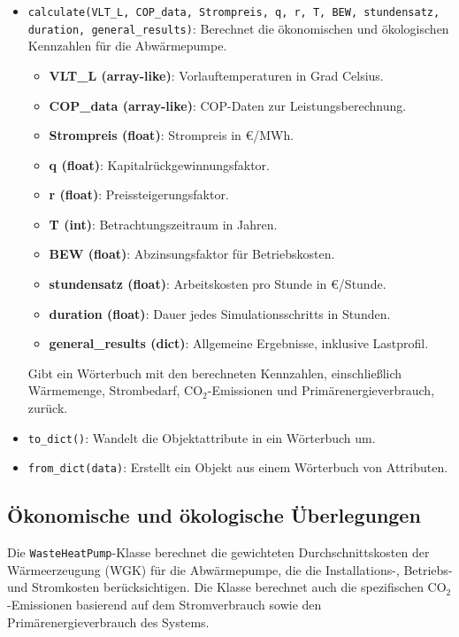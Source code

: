 \begin{itemize}
    \item \texttt{calculate(VLT\_L, COP\_data, Strompreis, q, r, T, BEW, stundensatz, duration, general\_results)}: 
    Berechnet die ökonomischen und ökologischen Kennzahlen für die Abwärmepumpe.
    \begin{itemize}
        \item \textbf{VLT\_L (array-like)}: Vorlauftemperaturen in Grad Celsius.
        \item \textbf{COP\_data (array-like)}: COP-Daten zur Leistungsberechnung.
        \item \textbf{Strompreis (float)}: Strompreis in €/MWh.
        \item \textbf{q (float)}: Kapitalrückgewinnungsfaktor.
        \item \textbf{r (float)}: Preissteigerungsfaktor.
        \item \textbf{T (int)}: Betrachtungszeitraum in Jahren.
        \item \textbf{BEW (float)}: Abzinsungsfaktor für Betriebskosten.
        \item \textbf{stundensatz (float)}: Arbeitskosten pro Stunde in €/Stunde.
        \item \textbf{duration (float)}: Dauer jedes Simulationsschritts in Stunden.
        \item \textbf{general\_results (dict)}: Allgemeine Ergebnisse, inklusive Lastprofil.
    \end{itemize}
    Gibt ein Wörterbuch mit den berechneten Kennzahlen, einschließlich Wärmemenge, Strombedarf, CO$_2$-Emissionen und Primärenergieverbrauch, zurück.

    \item \texttt{to\_dict()}: Wandelt die Objektattribute in ein Wörterbuch um.
    
    \item \texttt{from\_dict(data)}: Erstellt ein Objekt aus einem Wörterbuch von Attributen.
\end{itemize}

\subsection{Ökonomische und ökologische Überlegungen}
Die \texttt{WasteHeatPump}-Klasse berechnet die gewichteten Durchschnittskosten der Wärmeerzeugung (WGK) für die Abwärmepumpe, die die Installations-, Betriebs- und Stromkosten berücksichtigen. Die Klasse berechnet auch die spezifischen CO$_2$-Emissionen basierend auf dem Stromverbrauch sowie den Primärenergieverbrauch des Systems.

